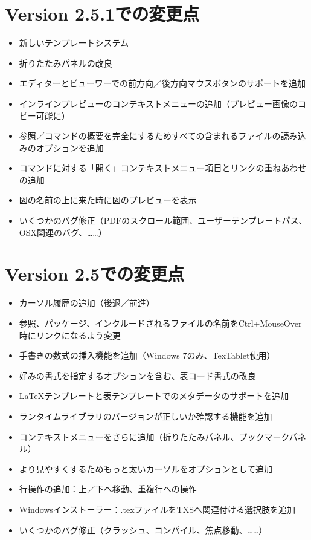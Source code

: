 \section{Version 2.5.1での変更点}

\begin{itemize}
\item
  新しいテンプレートシステム
\item
  折りたたみパネルの改良
\item
  エディターとビューワーでの前方向／後方向マウスボタンのサポートを追加
\item
  インラインプレビューのコンテキストメニューの追加（プレビュー画像のコピー可能に）
\item
  参照／コマンドの概要を完全にするためすべての含まれるファイルの読み込みのオプションを追加
\item
  \verb++コマンドに対する「開く」コンテキストメニュー項目とリンクの重ねあわせの追加
\item
  図の名前の上に来た時に図のプレビューを表示
\item
  いくつかのバグ修正（PDFのスクロール範囲、ユーザーテンプレートパス、OSX関連のバグ、……）
\end{itemize}

\section{Version 2.5での変更点}

\begin{itemize}
\item
  カーソル履歴の追加（後退／前進）
\item
  参照、パッケージ、インクルードされるファイルの名前をCtrl+MouseOver時にリンクになるよう変更
\item
  手書きの数式の挿入機能を追加（Windows 7のみ、TexTablet使用）
\item
  好みの書式を指定するオプションを含む、表コード書式の改良
\item
  LaTeXテンプレートと表テンプレートでのメタデータのサポートを追加
\item
  ランタイムライブラリのバージョンが正しいか確認する機能を追加
\item
  コンテキストメニューをさらに追加（折りたたみパネル、ブックマークパネル）
\item
  より見やすくするためもっと太いカーソルをオプションとして追加
\item
  行操作の追加：上／下へ移動、重複行への操作
\item
  Windowsインストーラー：.texファイルをTXSへ関連付ける選択肢を追加
\item
  いくつかのバグ修正（クラッシュ、コンパイル、焦点移動、……）
\end{itemize}

